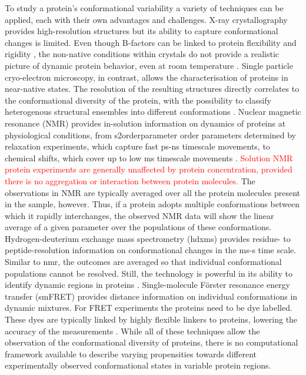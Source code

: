 To study a protein's conformational variability a variety of techniques can be applied, each with their own advantages and challenges. X-ray crystallography provides high-resolution structures but its ability to capture conformational changes is limited. Even though B-factors can be linked to protein flexibility and rigidity \cite{sun_utility_2019}, the non-native conditions within crystals do not provide a realistic picture of dynamic protein behavior, even at room temperature \cite{fenwick_integrated_2014}. Single particle cryo-electron microscopy, in contrast, allows the characterisation of proteins in near-native states. The resolution of the resulting structures directly correlates to the conformational diversity of the protein, with the possibility to classify heterogenous structural ensembles into different conformations \cite{cheng_single-particle_2018}. Nuclear magnetic resonance (NMR) provides in-solution information on dynamics of proteins at physiological conditions, from \gls{s2orderparameter} order parameters determined by relaxation experiments, which capture fast ps-ns timescale movements, to chemical shifts, which cover up to low ms timescale movements \cite{sekhar_nmr_2019}. \textcolor{red}{Solution NMR protein experiments are generally unaffected by protein concentration, provided there is no aggregation or interaction between protein molecules.} The observations in NMR are typically averaged over all the protein molecules present in the sample, however. Thus, if a protein adopts multiple conformations between which it rapidly interchanges, the observed NMR data will show the linear average of a given parameter over the populations of these conformations. Hydrogen-deuterium exchange mass spectrometry (\gls{hdxms}) provides residue- to peptide-resolution information on conformational changes in the ms-s time scale. Similar to \gls{nmr}, the outcomes are averaged so that individual conformational populations cannot be resolved. Still, the technology is powerful in its ability to identify dynamic regions in proteins \cite{beveridge_structural_2021}. Single-molecule Förster resonance energy transfer (smFRET) provides distance information on individual conformations in dynamic mixtures. For FRET experiments the proteins need to be dye labelled. These dyes are typically linked by highly flexible linkers to proteins, lowering the accuracy of the measurements \cite{agam_reliability_2023}. While all of these techniques allow the observation of the conformational diversity of proteins, there is no computational framework available to describe varying propensities towards different experimentally observed conformational states in variable protein regions.

